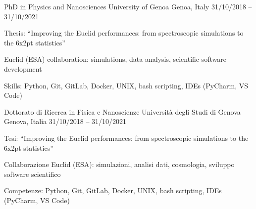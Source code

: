 


\begin{cventries}

\ifenglish
\cventry
{PhD in Physics and Nanosciences} %
{University of Genoa} %
{Genoa, Italy} %
{31/10/2018 -- 31/10/2021} %
{ %
\begin{cvitems}
  \item {Thesis: ``Improving the Euclid performances: from spectroscopic simulations to the 6x2pt statistics''}
  \item {Euclid (ESA) collaboration: simulations, data analysis, scientific software development}
  \item {Skills: Python, Git, GitLab, Docker, UNIX, bash scripting, IDEs (PyCharm, VS Code)}
\end{cvitems}
}
\else
\cventry
{Dottorato di Ricerca in Fisica e Nanoscienze} %
{Università degli Studi di Genova} %
{Genova, Italia} %
{31/10/2018 -- 31/10/2021} %
    { %
    \begin{cvitems}
    \item {Tesi: ``Improving the Euclid performances: from spectroscopic simulations to the 6x2pt statistics''}
    \item {Collaborazione Euclid (ESA): simulazioni, analisi dati, cosmologia, sviluppo software scientifico}
    \item {Competenze: Python, Git, GitLab, Docker, UNIX, bash scripting, IDEs (PyCharm, VS Code)}
    \end{cvitems}
}
\fi


\end{cventries}
